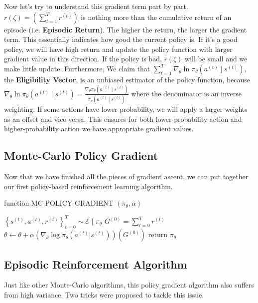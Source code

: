 \documentclass[11pt]{article}
\begin{document}
Now let's try to understand this gradient term part by part. $r(\zeta) = \left(\sum_{t=1}^{T} r^{(t)}\right)$ is nothing more than the cumulative return of an episode (i.e. \textbf{Episodic Return}). The higher the return, the larger the gradient term. This essentially indicates how good the current policy is. If it's a good policy, we will have high return and update the policy function with larger gradient value in this direction. If the policy is bad, $r(\zeta)$ will be small and we make little update. Furthermore, We claim that $\sum_{t=1}^{T} \nabla_{\theta} \ln \pi_{\theta}\left(a^{(t)} \mid s^{(t)}\right)$, the \textbf{Eligibility Vector}, is an unbiased estimator of the policy function, because $\nabla_{\theta} \ln \pi_{\theta}\left(a^{(t)} \mid s^{(t)}\right) = \frac{\nabla_{\theta} \pi_{\theta}\left(a^{(t)} \mid s^{(t)}\right)}{ \pi_{\theta}\left(a^{(t)} \mid s^{(t)}\right)}$ where the denominator is an inverse weighting. If some actions have lower probability, we will apply a larger weights as an offset and vice versa. This ensures for both lower-probability action and higher-probability action we have appropriate gradient values.

\subsection{Monte-Carlo Policy Gradient}
Now that we have finished all the pieces of gradient ascent, we can put together our first policy-based reinforcement learning algorithm.
\begin{algorithm}
\caption{function MC-POLICY-GRADIENT $\left(\pi_{\theta}, \alpha\right)$}\label{alg:alg1}
\begin{algorithmic}
\STATE $\left\{s^{(t)}, a^{(t)}, r^{(t)}\right\}_{t=0}^{T} \sim \mathcal{E} \mid \pi_{\theta}$
\STATE $G^{(0)}=\sum_{t=0}^{T} r^{(t)}$
\STATE $\theta \leftarrow \theta+\alpha\left(\nabla_{\theta} \log \pi_{\theta}\left(a^{(t)} | s^{(t)}\right)\right)\left(G^{(0)}\right)$
\ENDFOR
\ENDFOR
\STATE return $\pi_{\theta}$
\end{algorithmic}
\end{algorithm}

\subsection{Episodic Reinforcement Algorithm}
Just like other Monte-Carlo algorithms, this policy gradient algorithm also suffers from high variance. Two tricks were proposed to tackle this issue.
\end{document}
